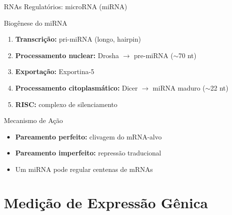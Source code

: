 \begin{frame}{RNAs Regulatórios: microRNA (miRNA)}
\begin{block}{Biogênese do miRNA}
\begin{enumerate}
    \item \textbf{Transcrição:} pri-miRNA (longo, hairpin)
    \item \textbf{Processamento nuclear:} Drosha $\rightarrow$ pre-miRNA ($\sim$70 nt)
    \item \textbf{Exportação:} Exportina-5
    \item \textbf{Processamento citoplasmático:} Dicer $\rightarrow$ miRNA maduro ($\sim$22 nt)
    \item \textbf{RISC:} complexo de silenciamento
\end{enumerate}
\end{block}

\vspace{0.3cm}

\begin{exampleblock}{Mecanismo de Ação}
\begin{itemize}
    \item \textbf{Pareamento perfeito:} clivagem do mRNA-alvo
    \item \textbf{Pareamento imperfeito:} repressão traducional
    \item Um miRNA pode regular centenas de mRNAs
\end{itemize}
\end{exampleblock}
\end{frame}

\section{Medição de Expressão Gênica}

